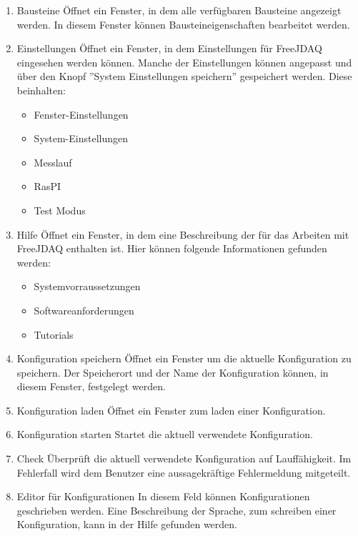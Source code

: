 \documentclass[parskip=full]{scrartcl}
\begin{document}
\begin{enumerate}
    \item Bausteine
    Öffnet ein Fenster, in dem alle verfügbaren Bausteine angezeigt werden. In diesem Fenster können Bausteineigenschaften bearbeitet werden.
    
    \item Einstellungen
    Öffnet ein Fenster, in dem Einstellungen für FreeJDAQ eingesehen werden können. Manche der Einstellungen können angepasst und über den Knopf ''System Einstellungen speichern'' gespeichert werden. Diese beinhalten:
    \begin{itemize}
        \item Fenster-Einstellungen
        \item System-Einstellungen
        \item Messlauf
        \item RasPI
        \item Test Modus
    \end{itemize}
    
    \item Hilfe
    Öffnet ein Fenster, in dem eine Beschreibung der für das Arbeiten mit FreeJDAQ enthalten ist. Hier können folgende Informationen gefunden werden:
    \begin{itemize}
        \item Systemvorraussetzungen
        \item Softwareanforderungen
        \item Tutorials
    \end{itemize}

    \item Konfiguration speichern
    Öffnet ein Fenster um die aktuelle Konfiguration zu speichern. Der Speicherort und der Name der Konfiguration können, in diesem Fenster, festgelegt werden.
    
    \item Konfiguration laden
    Öffnet ein Fenster zum laden einer Konfiguration.
    
    \item Konfiguration starten
    Startet die aktuell verwendete Konfiguration.
    
    \item Check
    Überprüft die aktuell verwendete Konfiguration auf Lauffähigkeit. Im Fehlerfall wird dem Benutzer eine aussagekräftige Fehlermeldung mitgeteilt.
    
    \item Editor für Konfigurationen
    In diesem Feld können Konfigurationen geschrieben werden. Eine Beschreibung der Sprache, zum schreiben einer Konfiguration, kann in der Hilfe gefunden werden.
    

\end{enumerate}
\end{document}
